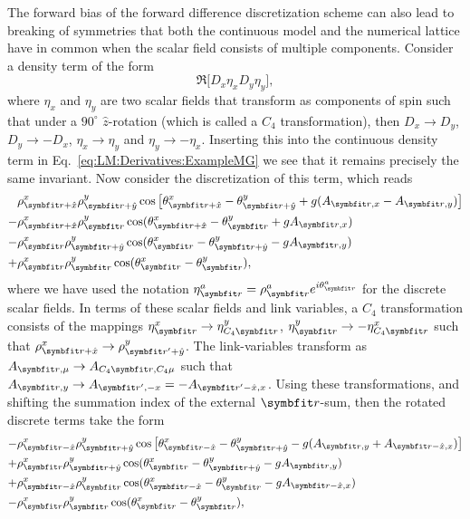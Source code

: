 The forward bias of the forward difference discretization scheme can also lead to breaking of symmetries that both the continuous model and the
numerical lattice have in common when the scalar field consists of multiple components. Consider a density term of the form
\begin{equation}
    \label{eq:LM:Derivatives:ExampleMG}
    \Re\Big[D_x\eta_xD_y\eta_y\Big],
\end{equation}
where $\eta_x$ and $\eta_y$ are two scalar fields that transform as components of spin such that under a $90^\circ$ $\hat{z}$-rotation
(which is called a $C_4$ transformation), then
$D_x\to D_y$, $D_y\to -D_x$, $\eta_x\to \eta_y$ and $\eta_y\to -\eta_x$. Inserting this into the continuous density term in 
Eq.~\eqref{eq:LM:Derivatives:ExampleMG} we see that it remains precisely the same \ie invariant. Now consider the discretization of this term,
which reads
\begin{equation}
    \label{eq:LM:Derivatives:ExampleMG:Discrete}
    \begin{split}
        &\rho^x_{\v{r}+\hat{x}}\rho^y_{\v{r}+\hat{y}}\cos\big[\theta^x_{\v{r}+\hat{x}}-\theta^y_{\v{r}+\hat{y}}+g(A_{\v{r},x}-A_{\v{r},y})\big]\\
        - &\rho^x_{\v{r}+\hat{x}}\rho^y_\v{r}\cos(\theta^x_{\v{r}+\hat{x}} - \theta^y_\v{r} + gA_{\v{r},x})\\
        - &\rho^x_\v{r}\rho^y_{\v{r}+\hat{y}}\cos(\theta^x_\v{r}-\theta^y_{\v{r}+\hat{y}}-gA_{\v{r},y})\\
        + &\rho^x_\v{r}\rho^y_\v{r}\cos(\theta^x_\v{r}-\theta^y_\v{r}),
    \end{split}
\end{equation}
where we have used the notation $\eta^a_\v{r} = \rho^a_\v{r}e^{i\theta^a_\v{r}}$ for the discrete scalar fields. In terms of these scalar fields
and link variables, a $C_4$ transformation consists of the mappings $\eta^x_\v{r}\to\eta^y_{C_4\v{r}}$, $\eta^y_\v{r}\to-\eta^x_{C_4\v{r}}$
such that \eg $\rho^x_{\v{r}+\hat{x}} \to \rho^y_{\v{r}'+\hat{y}}$. The link-variables transform as $A_{\v{r},\mu}\to A_{C_4\v{r},C_4\mu}$ such
that \eg $A_{\v{r},y}\to A_{\v{r}',-x}=-A_{\v{r}'-\hat{x},x}$. Using these transformations, and shifting the summation index of the 
external $\v{r}$-sum, then the rotated discrete terms take the form
\begin{equation}
    \label{eq:LM:Derivatives:ExampleMG:Discrete:Rotated}
    \begin{split}
        -&\rho^x_{\v{r}-\hat{x}}\rho^y_{\v{r}+\hat{y}}\cos\big[\theta^x_{\v{r}-\hat{x}}-\theta^y_{\v{r}+\hat{y}}-g(A_{\v{r},y}+A_{\v{r}-\hat{x},x})\big]\\
        +&\rho^x_\v{r}\rho^y_{\v{r}+\hat{y}}\cos(\theta^x_\v{r} - \theta^y_{\v{r}+\hat{y}}-gA_{\v{r},y})\\
        +&\rho^x_{\v{r}-\hat{x}}\rho^y_\v{r}\cos(\theta^x_{\v{r}-\hat{x}}-\theta^y_\v{r}-gA_{\v{r}-\hat{x},x})\\
        -&\rho^x_\v{r}\rho^y_\v{r}\cos(\theta^x_\v{r}-\theta^y_\v{r}),
    \end{split}
\end{equation}
